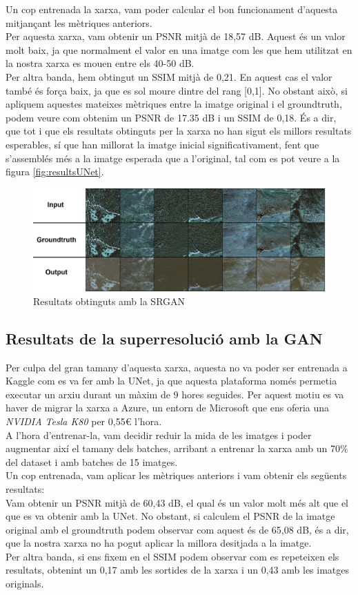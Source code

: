 ﻿\documentclass[10pt,a4paper,twocolumn,twoside]{article}
\begin{document}
Un cop entrenada la xarxa, vam poder calcular el bon funcionament d'aquesta mitjançant les mètriques anteriors.\\
Per aquesta xarxa, vam obtenir un PSNR mitjà de 18,57 dB. Aquest és un valor molt baix, ja que normalment el valor en una imatge com les que hem utilitzat en la nostra xarxa es mouen entre els 40-50 dB.
\\
Per altra banda, hem obtingut un SSIM mitjà de 0,21. En aquest cas el valor també és força baix, ja que es sol moure dintre del rang [0,1]. No obstant això, si apliquem aquestes mateixes mètriques entre la imatge original i el groundtruth, podem veure com obtenim un PSNR de 17.35 dB i un SSIM de 0,18. És a dir, que tot i que els resultats obtinguts per la xarxa no han sigut els millors resultats esperables, sí que han millorat la imatge inicial significativament, fent que s'assemblés més a la imatge esperada que a l'original, tal com es pot veure a la figura \ref{fig:resultsUNet}.
\begin{figure}[t]
\centering
\includegraphics[width=.9\textwidth]{img/resultatGAN.png}
\caption{Resultats obtinguts amb la SRGAN}
\label{fig:resultsGAN}
\end{figure}
\subsection{Resultats de la superresolució amb la GAN}
Per culpa del gran tamany d'aquesta xarxa, aquesta no va poder ser entrenada a Kaggle com es va fer amb la UNet, ja que aquesta plataforma només permetia executar un arxiu durant un màxim de 9 hores seguides. Per aquest motiu es va haver de migrar la xarxa a Azure, un entorn de Microsoft que ens oferia una \textit{NVIDIA Tesla K80} per 0,55€ l'hora.\\
A l'hora d'entrenar-la, vam decidir reduir la mida de les imatges i poder augmentar així el tamany dels batches, arribant a entrenar la xarxa amb un 70\% del dataset i amb batches de 15 imatges.\\ Un cop entrenada, vam aplicar les mètriques anteriors i vam obtenir els següents resultats:\\
Vam obtenir un PSNR mitjà de 60,43 dB, el qual és un valor molt més alt que el que es va obtenir amb la UNet. No obstant, si calculem el PSNR de la imatge original amb el groundtruth podem observar com aquest és de 65,08 dB, és a dir, que la nostra xarxa no ha pogut aplicar la millora desitjada a la imatge.\\
Per altra banda, si ens fixem en el SSIM podem observar com es repeteixen els resultats, obtenint un 0,17 amb les sortides de la xarxa i un 0,43 amb les imatges originals.\\
\end{document}
